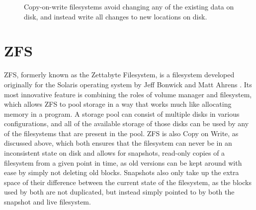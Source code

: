 \begin{figure}[H]
    \centering
    \resizebox{0.75\linewidth}{!}{}
    \captionsetup{width=0.75\linewidth}
    \caption{Copy-on-write filesystems avoid changing any of the existing data on disk, and instead write all changes to new locations on disk\cite{ahrens_openzfs_basics}.}
    \label{fig:cow}
\end{figure}

\chapter{ZFS}
ZFS, formerly known as the Zettabyte Filesystem, is a filesystem developed originally for the Solaris operating system
by Jeff Bonwick and Matt Ahrens \cite{ahrens_read_write}. 
Its most innovative feature is combining the roles of volume manager and filesystem, which allows ZFS to pool storage in a way that 
works much like allocating memory in a program\cite{mckusick_zfs_2015_presentation}.
A storage pool can consist of multiple disks in various configurations, and all of the available storage of those disks
can be used by any of the filesystems that are present in the pool.
ZFS is also Copy on Write, as discussed above, which both ensures that the filesystem can never be in an inconsistent state on disk
and allows for snapshots, read-only copies of a filesystem from a given point in time, 
as old versions can be kept around with ease by simply not deleting old blocks.
Snapshots also only take up the extra space of their difference between the current state of the filesystem,
as the blocks used by both are not duplicated, but instead simply pointed to by both the snapshot and live filesystem.

